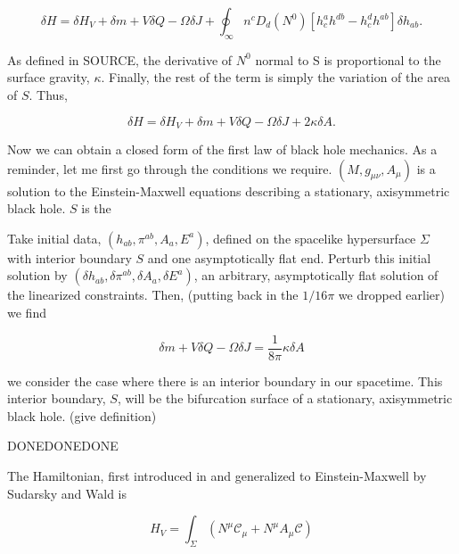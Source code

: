 \documentclass[titlepage]{article}
\def\beq{\begin{equation}}
\def\eeq{\end{equation}}
\begin{document}
\beq
\delta H = \delta H_V + \delta m + V\delta Q - \Omega \delta J +\oint_\infty n^c  D_d \left(N^0\right) \left[ h_c^ah^{db}-h_c^dh^{ab} \right] \delta h_{ab}.
\eeq

\noindent
As defined in SOURCE, the derivative of $N^0$ normal to S is proportional to the surface gravity, $\kappa$.  Finally, the rest of the term is simply the variation of the area of $S$.  Thus,

\beq
\delta H = \delta H_V + \delta m + V\delta Q - \Omega \delta J + 2\kappa \delta A.
\eeq


Now we can obtain a closed form of the first law of black hole mechanics.  As a reminder, let me first go through the conditions we require.  $(M,g_{\mu\nu},A_\mu)$ is a solution to the Einstein-Maxwell equations describing a stationary, axisymmetric black hole.  $S$ is the 

Take initial data, $( h_{ab},\pi^{ab}, A_a, E^a)$, defined on the spacelike hypersurface $\Sigma$ with interior boundary $S$ and one asymptotically flat end.  Perturb this initial solution by $(\delta h_{ab},\delta\pi^{ab},\delta A_a,\delta E^a)$, an arbitrary, asymptotically flat solution of the linearized constraints.  Then, (putting back in the $1/16\pi$ we dropped earlier) we find 

\beq
\delta m + V \delta Q -\Omega \delta J= \frac{1}{8\pi} \kappa \delta A
\eeq



we consider the case where there is an interior boundary in our spacetime.  This interior boundary, $S$, will be the bifurcation surface of a stationary, axisymmetric black hole. (give definition) 



DONEDONEDONE


\newpage

The Hamiltonian, first introduced in \cite{regge1974improved} and generalized to Einstein-Maxwell by Sudarsky and Wald \cite{sudarskyExtrema92} is 

\beq
H_V=\int_\Sigma\left(N^\mu\mathcal{C}_\mu+N^\mu A_\mu \mathcal{C} \right)
\eeq
\end{document}

